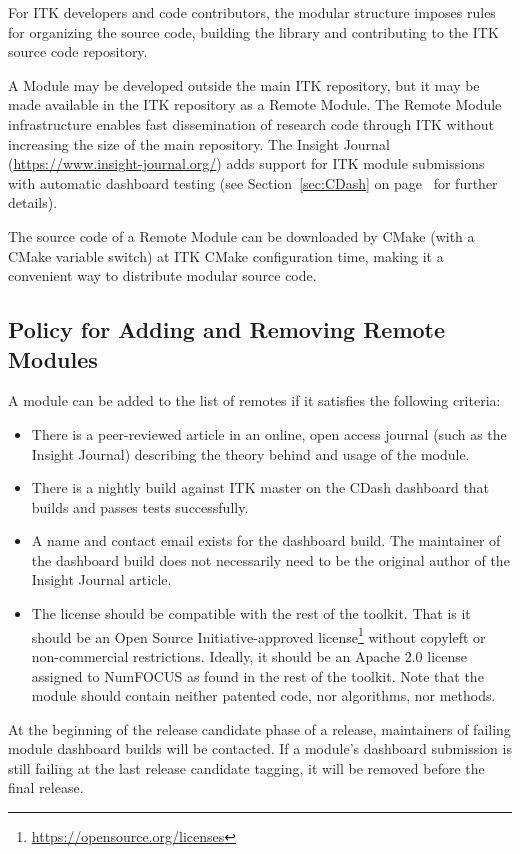 For ITK developers and code contributors, the modular structure imposes rules
for organizing the source code, building the library and contributing to the
ITK source code repository.

A Module may be developed outside the main ITK repository, but it may be
made available in the ITK repository as a Remote Module. The Remote Module
infrastructure enables fast dissemination of research code through ITK without
increasing the size of the main repository. The Insight Journal
(\url{https://www.insight-journal.org/}) adds support for ITK module submissions
with automatic dashboard testing (see Section~\ref{sec:CDash} on
page~\pageref{sec:CDash} for further details).

The source code of a Remote Module can be downloaded by CMake (with a CMake
variable switch) at ITK CMake configuration time, making it a convenient way to
distribute modular source code.

\subsection{Policy for Adding and Removing Remote Modules}
\label{subsec:RemoteModuleAddRemovePolicy}

A module can be added to the list of remotes if it satisfies the following
criteria:
\begin{itemize}
\item There is a peer-reviewed article in an online, open access journal (such
as the Insight Journal) describing the theory behind and usage of the module.
\item There is a nightly build against ITK master on the CDash dashboard that
builds and passes tests successfully.
\item A name and contact email exists for the dashboard build. The maintainer
of the dashboard build does not necessarily need to be the original author of
the Insight Journal article.
\item The license should be compatible with the rest of the toolkit. That is
it should be an Open Source Initiative-approved
license\footnote{\url{https://opensource.org/licenses}} without copyleft or
non-commercial restrictions. Ideally, it should be an Apache 2.0 license
assigned to NumFOCUS as found in the rest of the toolkit. Note that the module
should contain neither patented code, nor algorithms, nor methods.
\end{itemize}

At the beginning of the release candidate phase of a release, maintainers of
failing module dashboard builds will be contacted. If a module's dashboard
submission is still failing at the last release candidate tagging, it will be
removed before the final release.


